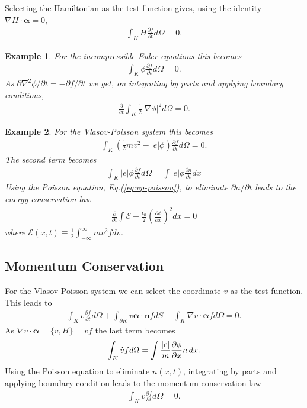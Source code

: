 \documentclass[11pt, reqno]{amsart}
\newcommand{\eqr}[1]{Eq.\thinspace(#1)}
\newcommand{\pfrac}[2]{\frac{\partial #1}{\partial #2}}
\newcommand{\pfraca}[1]{\frac{\partial}{\partial #1}}
\newcommand{\mvec}[1]{\mathbf{#1}}
\newcommand{\gvec}[1]{\boldsymbol{#1}}
\newtheorem{example}{Example}
\theoremstyle{definition}
\begin{document}
Selecting the Hamiltonian as the test function gives, using the
identity $\nabla H \cdot \gvec{\alpha} = 0$,
\begin{align}
  \int_K H \pfrac{f}{t}d\Omega = 0.
\end{align}

\begin{example}
  For the incompressible Euler equations this becomes
  \begin{align}
    \int_K \phi \pfrac{f}{t}d\Omega = 0.
  \end{align}
  As ${\partial \nabla^2 \phi}/{\partial t} = -\partial f/{\partial
    t}$ we get, on integrating by parts and applying boundary
  conditions,
  \begin{align}
    \pfraca{t}\int_K \frac{1}{2} |\nabla\phi|^2  d\Omega = 0.
  \end{align}
\end{example}

\begin{example}
  For the Vlasov-Poisson system this becomes
  \begin{align}
    \int_K \left(\frac{1}{2}mv^2 - |e|\phi\right) \pfrac{f}{t}d\Omega = 0.
  \end{align}
  The second term becomes
  \begin{align}
    \int_K |e|\phi \pfrac{f}{t}d\Omega = \int |e|\phi \pfrac{n}{t} dx
  \end{align}
  Using the Poisson equation, \eqr{\ref{eq:vp-poisson}}, to eliminate
  ${\partial n}/{\partial t}$ leads to the energy conservation law
  \begin{align}
    \pfraca{t}\int \mathcal{E} +
    \frac{\epsilon_0}{2}\left(\pfrac{\phi}{x}\right)^2 dx = 0
  \end{align}
  where $\mathcal{E}(x,t) \equiv \frac{1}{2}\int_{-\infty}^{\infty} mv^2f dv$.
\end{example}

\subsection{Momentum Conservation}

For the Vlasov-Poisson system we can select the coordinate $v$ as the
test function. This leads to
\begin{align}
  \int_K v\pfrac{f}{t}d\Omega 
  + \int_{\partial K}v \gvec{\alpha}\cdot\mvec{n}f dS
  - \int_K \nabla v \cdot \gvec{\alpha} f d\Omega
 = 0.
\end{align}
As $\nabla v \cdot \gvec{\alpha} = \{v,H\} = \dot{v}f$ the last term
becomes
\begin{align}
  \int_K\dot{v} f d\Omega = \int \frac{|e|}{m} \pfrac{\phi}{x} n\thinspace dx.
\end{align}
Using the Poisson equation to eliminate $n(x,t)$, integrating by parts
and applying boundary condition leads to the momentum conservation law
\begin{align}
  \int_K v\pfrac{f}{t}d\Omega = 0.
\end{align}
\end{document}
